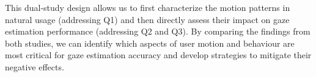 This dual-study design allows us to first characterize the motion patterns in natural usage (addressing Q1) and then directly assess their impact on gaze estimation performance (addressing Q2 and Q3). By comparing the findings from both studies, we can identify which aspects of user motion and behaviour are most critical for gaze estimation accuracy and develop strategies to mitigate their negative effects.



